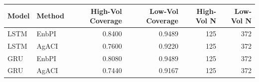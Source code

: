 \begin{tabular}{llrrrr}
\toprule
Model & Method & High-Vol Coverage & Low-Vol Coverage & High-Vol N & Low-Vol N \\
\midrule
LSTM & EnbPI & 0.8400 & 0.9489 & 125 & 372 \\
LSTM & AgACI & 0.7600 & 0.9220 & 125 & 372 \\
GRU & EnbPI & 0.8080 & 0.9489 & 125 & 372 \\
GRU & AgACI & 0.7440 & 0.9167 & 125 & 372 \\
\bottomrule
\end{tabular}
